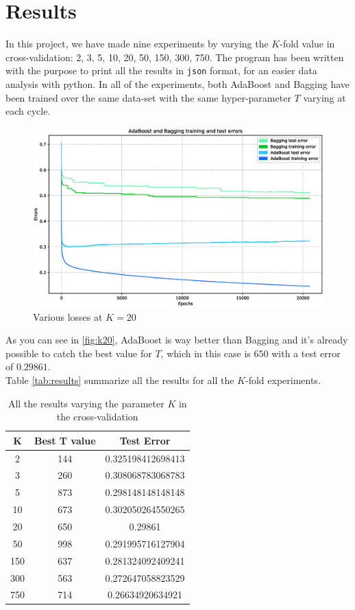 
\chapter{Results}

In this project, we have made nine experiments by varying the $K$-fold value in cross-validation: 2, 3, 5, 10, 20, 50, 150, 300, 750. The program has been written with the purpose to print all the results in \texttt{json} format, for an easier data analysis with python. In all of the experiments, both AdaBoost and Bagging have been trained over the same data-set with the same hyper-parameter $T$ varying at each cycle.\\
\begin{figure}[htpb]
	\centering
	\includegraphics[scale=0.35]{figs/report_k20.eps}
	\caption{Various losses at $K = 20$}
	\label{fig:k20}
\end{figure}
As you can see in \autoref{fig:k20}, AdaBoost is way better than Bagging and it's already possible to catch the best value for $T$, which in this case is $650$ with a test error of $0.29861$.\\
Table \autoref{tab:results} summarize all the results for all the $K$-fold experiments.

\begin{table}
\centering
\begin{tabular}{|c|c|c|}
	\hline 
	K & Best T value & Test Error \\ 
	\hline 
	2 & 144 & 0.325198412698413 \\ 
	\hline 
	3 & 260 & 0.308068783068783 \\ 
	\hline 
	5 & 873 & 0.298148148148148 \\ 
	\hline 
	10 & 673 & 0.302050264550265 \\ 
	\hline 
	20 & 650 & 0.29861 \\ 
	\hline 
	50 & 998 & 0.291995716127904 \\ 
	\hline 
	150 & 637 & 0.281324092409241 \\ 
	\hline 
	300 & 563 & 0.272647058823529 \\ 
	\hline 
	750 & 714 & 0.26634920634921 \\ 
	\hline 
\end{tabular}
\caption{All the results varying the parameter $K$ in the cross-validation}
\label{tab:results} 
\end{table}

